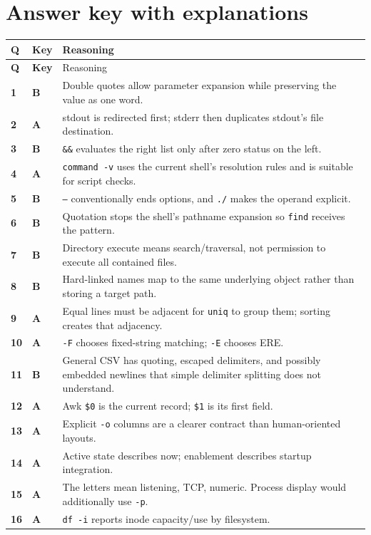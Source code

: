 \documentclass[11pt,oneside,openany]{book}
\begin{document}
\section{Answer key with explanations}
\begin{longtable}{>{\bfseries}p{}>{\bfseries\color{Blue}}p{}p{}}
\toprule
Q & Key & Reasoning \\
\midrule
\endfirsthead\toprule Q & Key & Reasoning \\
\midrule\endhead
1 & B & Double quotes allow parameter expansion while preserving the value as one word. \\
2 & A & stdout is redirected first; stderr then duplicates stdout's file destination. \\
3 & B & \texttt{\&\&} evaluates the right list only after zero status on the left. \\
4 & A & \texttt{command -v} uses the current shell's resolution rules and is suitable for script checks. \\
5 & B & \texttt{--} conventionally ends options, and \texttt{./} makes the operand explicit. \\
6 & B & Quotation stops the shell's pathname expansion so \texttt{find} receives the pattern. \\
7 & B & Directory execute means search/traversal, not permission to execute all contained files. \\
8 & B & Hard-linked names map to the same underlying object rather than storing a target path. \\
9 & A & Equal lines must be adjacent for \texttt{uniq} to group them; sorting creates that adjacency. \\
10 & A & \texttt{-F} chooses fixed-string matching; \texttt{-E} chooses ERE. \\
11 & B & General CSV has quoting, escaped delimiters, and possibly embedded newlines that simple delimiter splitting does not understand. \\
12 & A & Awk \texttt{\$0} is the current record; \texttt{\$1} is its first field. \\
13 & A & Explicit \texttt{-o} columns are a clearer contract than human-oriented layouts. \\
14 & A & Active state describes now; enablement describes startup integration. \\
15 & A & The letters mean listening, TCP, numeric. Process display would additionally use \texttt{-p}. \\
16 & A & \texttt{df -i} reports inode capacity/use by filesystem. \\

\end{longtable}
\end{document}
